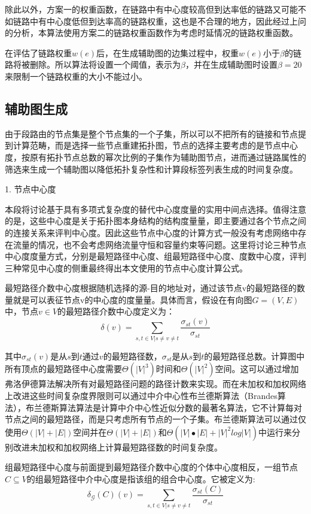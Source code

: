 除此以外，方案一的权重函数，在链路中有中心度较高但到达率低的链路又可能不如链路中有中心度低但到达率高的链路权重，这也是不合理的地方，因此经过上问的分析，本算法使用方案二的链路权重函数作为考虑时延情况的链路权重函数。

在评估了链路权重$w\left(e\right)$后，在生成辅助图的边集过程中，权重$w\left(e\right)$小于$\beta$的链路将被删除。所以算法将设置一个阈值，表示为$\beta$，并在生成辅助图时设置$\beta=20$来限制一个链路权重的大小不能过小。

\subsection{辅助图生成}

由于段路由的节点集是整个节点集的一个子集，所以可以不把所有的链接和节点提到计算范畴，而是选择一些节点重建拓扑图，节点的选择主要考虑的是节点中心度，按原有拓扑节点总数的幂次比例的子集作为辅助图节点，进而通过链路属性的筛选来生成一个辅助图以降低拓扑复杂性和计算段标签列表生成的时间复杂度。

1. 节点中心度

本段将讨论基于具有多项式复杂度的替代中心度度量的实用中间点选择。值得注意的是，这些中心度是关于拓扑图本身结构的结构度量量，即主要通过各个节点之间的连接关系来评判中心度。因此这些节点中心度的计算方式一般没有考虑网络中存在流量的情况，也不会考虑网络流量守恒和容量约束等问题。这里将讨论三种节点中心度度量方式，分别是最短路径中心度、组最短路径中心度、度数中心度，评判三种常见中心度的侧重最终得出本文使用的节点中心度计算公式。

最短路径介数中心度根据随机选择的源-目的地址对，通过该节点v的最短路径的数量就是可以表征节点v的中心度的度量量。具体而言，假设在有向图$G=\left(V,E\right)$中，节点$v \in V$的最短路径介数中心度定义为：
$$\delta\left(v\right)=\sum_{s,t\in V|s\neq v\neq t}\frac{\sigma_{st}\left(v\right)}{\sigma_{st}}$$

其中$\sigma_{st}\left(v\right)$是从$s$到$t$通过$v$的最短路径数，$\sigma_{st}$是从$s$到$t$的最短路径总数。计算图中所有顶点的最短路径中心度需要$\Theta({|V|}^3)$时间和$\Theta({|V|}^2)$空间。这可以通过增加弗洛伊德算法解决所有对最短路径问题的路径计数来实现。而在未加权和加权网络上改进这些时间复杂度界限则可以通过中介中心性布兰德斯算法（Brandes算法），布兰德斯算法算法是计算中介中心性近似分数的最著名算法，它不计算每对节点之间的最短路径，而是只考虑所有节点的一个子集。布兰德斯算法可以通过仅使用$\Theta(|V|+|E|)$空间并在$\Theta(|V|+|E|)$和$\Theta(|V|\bullet|E|+{|V|}^2log|V|)$中运行来分别改进未加权和加权网络上计算最短路径数的时间复杂度。

组最短路径中心度与前面提到最短路径介数中心度的个体中心度相反，一组节点$C\subseteq V$的组最短路径中介中心度是指该组的组合中心度。它被定义为:
$$\delta_\mathcal{G}(C)\left(v\right)=\sum_{s,t\in V|s\neq v\neq t}\frac{\sigma_{st}\left(C\right)}{\sigma_{st}}$$

